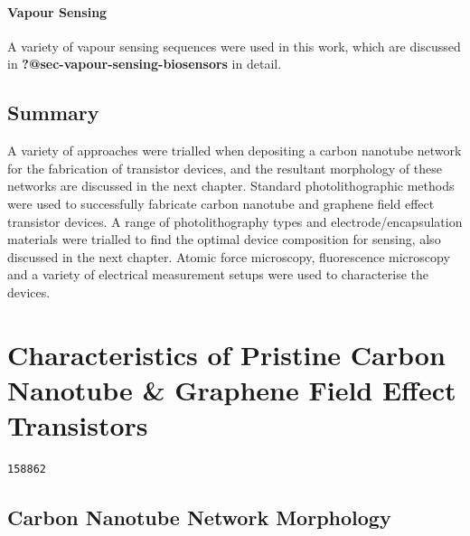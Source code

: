 \documentclass[
  a4paper,
]{scrbook}
\begin{document}
\hypertarget{vapour-sensing}{%
\subsubsection*{Vapour Sensing}\label{vapour-sensing}}

A variety of vapour sensing sequences were used in this work, which are
discussed in \textbf{?@sec-vapour-sensing-biosensors} in detail.

\hypertarget{summary}{%
\section{Summary}\label{summary}}

A variety of approaches were trialled when depositing a carbon nanotube
network for the fabrication of transistor devices, and the resultant
morphology of these networks are discussed in the next chapter. Standard
photolithographic methods were used to successfully fabricate carbon
nanotube and graphene field effect transistor devices. A range of
photolithography types and electrode/encapsulation materials were
trialled to find the optimal device composition for sensing, also
discussed in the next chapter. Atomic force microscopy, fluorescence
microscopy and a variety of electrical measurement setups were used to
characterise the devices.


\hypertarget{characteristics-of-pristine-carbon-nanotube-graphene-field-effect-transistors}{%
\chapter{Characteristics of Pristine Carbon Nanotube \& Graphene Field
Effect
Transistors}\label{characteristics-of-pristine-carbon-nanotube-graphene-field-effect-transistors}}

\begin{verbatim}
158862
\end{verbatim}

\hypertarget{sec-pristine-morphology}{%
\section{Carbon Nanotube Network
Morphology}\label{sec-pristine-morphology}}
\end{document}
